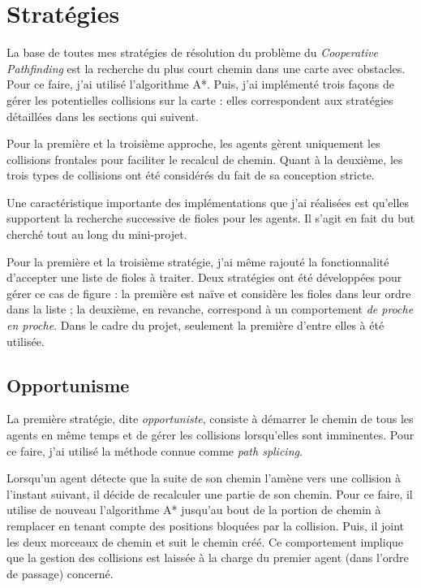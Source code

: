 \documentclass[letterpaper]{article}
\begin{document}
\section{Strat\'egies}
La base de toutes mes strat\'egies de r\'esolution du probl\`eme du \textit{Cooperative Pathfinding} est la recherche du plus court chemin dans une carte avec obstacles. 
Pour ce faire, j'ai utilis\'e l'algorithme A*.
Puis, j'ai impl\'ement\'e trois fa\c{c}ons de g\'erer les potentielles collisions sur la carte : elles correspondent aux strat\'egies d\'etaill\'ees dans les sections qui suivent.

Pour la premi\`ere et la troisi\`eme approche, les agents g\`erent uniquement les collisions frontales pour faciliter le recalcul de chemin. 
Quant \`a la deuxi\`eme, les trois types de collisions ont \'et\'e consid\'er\'es du fait de sa conception stricte.

Une caract\'eristique importante des impl\'ementations que j'ai r\'ealis\'ees est qu'elles supportent la recherche successive de fioles pour les agents.
Il s'agit en fait du but cherch\'e tout au long du mini-projet.

Pour la premi\`ere et la troisi\`eme strat\'egie, j'ai m\^eme rajout\'e la fonctionnalit\'e d'accepter une liste de fioles \`a traiter.
Deux strat\'egies ont \'et\'e d\'evelopp\'ees pour g\'erer ce cas de figure : la premi\`ere est na\"ive et consid\`ere les fioles dans leur ordre dans la liste ; la deuxi\`eme, en revanche, correspond \`a un comportement \textit{de proche en proche}.
Dans le cadre du projet, seulement la premi\`ere d'entre elles \`a \'et\'e utilis\'ee.

\subsection{Opportunisme}
La premi\`ere strat\'egie, dite \textit{opportuniste}, consiste \`a d\'emarrer le chemin de tous les agents en m\^eme temps et de g\'erer les collisions lorsqu'elles sont imminentes.
Pour ce faire, j'ai utilis\'e la m\'ethode connue comme \textit{path splicing}.

Lorsqu'un agent d\'etecte que la suite de son chemin l'am\`ene vers une collision \`a l'instant suivant, il d\'ecide de recalculer une partie de son chemin.
Pour ce faire, il utilise de nouveau l'algorithme A* jusqu'au bout de la portion de chemin \`a remplacer en tenant compte des positions bloqu\'ees par la collision.
Puis, il joint les deux morceaux de chemin et suit le chemin cr\'e\'e.
Ce comportement implique que la gestion des collisions est laiss\'ee \`a la charge du premier agent (dans l'ordre de passage) concern\'e.
\end{document}
